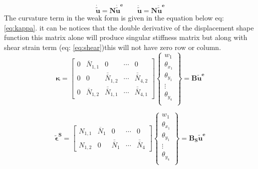 \documentclass[main.tex]{subfiles}
\begin{document}
\begin{equation}
 \mathbf{ \dot{\tilde{u}} } = \mathbf{N}              \mathbf{\dot{\tilde{u}}^e}
 \qquad  
 \mathbf{ \ddot{\tilde{u}} } = \mathbf{N}  \mathbf{\ddot{\tilde{u}}^e}
\end{equation}
The curvature term in the weak form is given in the equation below eq:\ref{eq:kappa}. it can be notices that the double derivative of the displacement shape function this matrix alone will produce singular stiffness matrix but along with shear strain term (eq: \ref{eq:shear})this will not have zero row or column. 
\begin{equation}\label{eq:kappa}
\mathbf{ \kappa } = 
\begin{bmatrix}
0 & \overline{N}_{1,1} & 0 & \cdots & 0 \\
0&  0 & \overline{\overline{N}}_{1,2}  & \cdots & \overline{\overline{N}}_{4,2} 
\\
0&  \overline{N}_{1,2} & \overline{\overline{N}}_{1,1}  & \cdots & \overline{\overline{N}}_{4,1} 
\end{bmatrix} 
\left\{
\begin{array}{r}
w_1 \\
\theta_{x_1} \\
\theta_{y_1} \\
\vdots \\
\theta_{y_{4}} \\
\end{array} \right\}=\mathbf{ B } \mathbf{\tilde{u}^e}
\end{equation}


\begin{equation} \label{eq:shear}
\mathbf{\tilde{\epsilon}^S} = 
\begin{bmatrix}
N_{1,1} & \overline{N}_{1} & 0 & \cdots & 0 
\\
N_{1,2} & 0 & \overline{\overline{N}}_{1} & \cdots & \overline{\overline{N}}_{4} 
\end{bmatrix} 
\left\{
\begin{array}{r}
w_1 \\
\theta_{x_1} \\
\theta_{y_1} \\
\vdots \\
\theta_{y_{4}} \\
\end{array} \right\}=\mathbf{ B_S } \mathbf{\tilde{u}^e}
\end{equation}
\end{document}
